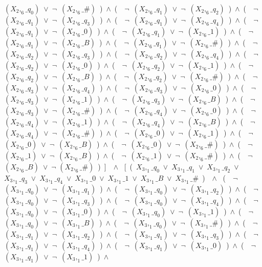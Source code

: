 ﻿\documentclass[a4paper,10pt]{article}
\begin{document}
$(X_2,_6\_q_0)$\ $\vee$\ $\neg$\ $(X_2,_6\_\#)$\ )\ $\wedge$\ (\ \ $\neg$\ $(X_2,_6\_q_1)$\ $\vee$\ $\neg$\ $(X_2,_6\_q_2)$\ )\ $\wedge$\ (\ \ $\neg$\ $(X_2,_6\_q_1)$\ $\vee$\ $\neg$\ $(X_2,_6\_q_3)$\ )\ $\wedge$\ (\ \ $\neg$\ $(X_2,_6\_q_1)$\ $\vee$\ $\neg$\ $(X_2,_6\_q_4)$\ )\ $\wedge$\ (\ \ $\neg$\ $(X_2,_6\_q_1)$\ $\vee$\ $\neg$\ $(X_2,_6\_0)$\ )\ $\wedge$\ (\ \ $\neg$\ $(X_2,_6\_q_1)$\ $\vee$\ $\neg$\ $(X_2,_6\_1)$\ )\ $\wedge$\ (\ \ $\neg$\ $(X_2,_6\_q_1)$\ $\vee$\ $\neg$\ $(X_2,_6\_B)$\ )\ $\wedge$\ (\ \ $\neg$\ $(X_2,_6\_q_1)$\ $\vee$\ $\neg$\ $(X_2,_6\_\#)$\ )\ $\wedge$\ (\ \ $\neg$\ $(X_2,_6\_q_2)$\ $\vee$\ $\neg$\ $(X_2,_6\_q_3)$\ )\ $\wedge$\ (\ \ $\neg$\ $(X_2,_6\_q_2)$\ $\vee$\ $\neg$\ $(X_2,_6\_q_4)$\ )\ $\wedge$\ (\ \ $\neg$\ $(X_2,_6\_q_2)$\ $\vee$\ $\neg$\ $(X_2,_6\_0)$\ )\ $\wedge$\ (\ \ $\neg$\ $(X_2,_6\_q_2)$\ $\vee$\ $\neg$\ $(X_2,_6\_1)$\ )\ $\wedge$\ (\ \ $\neg$\ $(X_2,_6\_q_2)$\ $\vee$\ $\neg$\ $(X_2,_6\_B)$\ )\ $\wedge$\ (\ \ $\neg$\ $(X_2,_6\_q_2)$\ $\vee$\ $\neg$\ $(X_2,_6\_\#)$\ )\ $\wedge$\ (\ \ $\neg$\ $(X_2,_6\_q_3)$\ $\vee$\ $\neg$\ $(X_2,_6\_q_4)$\ )\ $\wedge$\ (\ \ $\neg$\ $(X_2,_6\_q_3)$\ $\vee$\ $\neg$\ $(X_2,_6\_0)$\ )\ $\wedge$\ (\ \ $\neg$\ $(X_2,_6\_q_3)$\ $\vee$\ $\neg$\ $(X_2,_6\_1)$\ )\ $\wedge$\ (\ \ $\neg$\ $(X_2,_6\_q_3)$\ $\vee$\ $\neg$\ $(X_2,_6\_B)$\ )\ $\wedge$\ (\ \ $\neg$\ $(X_2,_6\_q_3)$\ $\vee$\ $\neg$\ $(X_2,_6\_\#)$\ )\ $\wedge$\ (\ \ $\neg$\ $(X_2,_6\_q_4)$\ $\vee$\ $\neg$\ $(X_2,_6\_0)$\ )\ $\wedge$\ (\ \ $\neg$\ $(X_2,_6\_q_4)$\ $\vee$\ $\neg$\ $(X_2,_6\_1)$\ )\ $\wedge$\ (\ \ $\neg$\ $(X_2,_6\_q_4)$\ $\vee$\ $\neg$\ $(X_2,_6\_B)$\ )\ $\wedge$\ (\ \ $\neg$\ $(X_2,_6\_q_4)$\ $\vee$\ $\neg$\ $(X_2,_6\_\#)$\ )\ $\wedge$\ (\ \ $\neg$\ $(X_2,_6\_0)$\ $\vee$\ $\neg$\ $(X_2,_6\_1)$\ )\ $\wedge$\ (\ \ $\neg$\ $(X_2,_6\_0)$\ $\vee$\ $\neg$\ $(X_2,_6\_B)$\ )\ $\wedge$\ (\ \ $\neg$\ $(X_2,_6\_0)$\ $\vee$\ $\neg$\ $(X_2,_6\_\#)$\ )\ $\wedge$\ (\ \ $\neg$\ $(X_2,_6\_1)$\ $\vee$\ $\neg$\ $(X_2,_6\_B)$\ )\ $\wedge$\ (\ \ $\neg$\ $(X_2,_6\_1)$\ $\vee$\ $\neg$\ $(X_2,_6\_\#)$\ )\ $\wedge$\ (\ \ $\neg$ $(X_2,_6\_B)$\ $\vee$\ $\neg$ $(X_2,_6\_\#)$\ )\ ]\ \ $\wedge$ \ [\ (\ $X_3,_1\_q_0$\ $\vee$\ $X_3,_1\_q_1$\ $\vee$\ $X_3,_1\_q_2$\ $\vee$\ $X_3,_1\_q_3$\ $\vee$\ $X_3,_1\_q_4$\ $\vee$\ $X_3,_1\_0$\ $\vee$\ $X_3,_1\_1$\ $\vee$\ $X_3,_1\_B$\ $\vee$\ $X_3,_1\_\#$\ )\ \ $\wedge$ \ (\ \ $\neg$\ $(X_3,_1\_q_0)$\ $\vee$\ $\neg$\ $(X_3,_1\_q_1)$\ )\ $\wedge$\ (\ \ $\neg$\ $(X_3,_1\_q_0)$\ $\vee$\ $\neg$\ $(X_3,_1\_q_2)$\ )\ $\wedge$\ (\ \ $\neg$\ $(X_3,_1\_q_0)$\ $\vee$\ $\neg$\ $(X_3,_1\_q_3)$\ )\ $\wedge$\ (\ \ $\neg$\ $(X_3,_1\_q_0)$\ $\vee$\ $\neg$\ $(X_3,_1\_q_4)$\ )\ $\wedge$\ (\ \ $\neg$\ $(X_3,_1\_q_0)$\ $\vee$\ $\neg$\ $(X_3,_1\_0)$\ )\ $\wedge$\ (\ \ $\neg$\ $(X_3,_1\_q_0)$\ $\vee$\ $\neg$\ $(X_3,_1\_1)$\ )\ $\wedge$\ (\ \ $\neg$\ $(X_3,_1\_q_0)$\ $\vee$\ $\neg$\ $(X_3,_1\_B)$\ )\ $\wedge$\ (\ \ $\neg$\ $(X_3,_1\_q_0)$\ $\vee$\ $\neg$\ $(X_3,_1\_\#)$\ )\ $\wedge$\ (\ \ $\neg$\ $(X_3,_1\_q_1)$\ $\vee$\ $\neg$\ $(X_3,_1\_q_2)$\ )\ $\wedge$\ (\ \ $\neg$\ $(X_3,_1\_q_1)$\ $\vee$\ $\neg$\ $(X_3,_1\_q_3)$\ )\ $\wedge$\ (\ \ $\neg$\ $(X_3,_1\_q_1)$\ $\vee$\ $\neg$\ $(X_3,_1\_q_4)$\ )\ $\wedge$\ (\ \ $\neg$\ $(X_3,_1\_q_1)$\ $\vee$\ $\neg$\ $(X_3,_1\_0)$\ )\ $\wedge$\ (\ \ $\neg$\ $(X_3,_1\_q_1)$\ $\vee$\ $\neg$\ $(X_3,_1\_1)$\ )\ $\wedge$\ 
\end{document}

